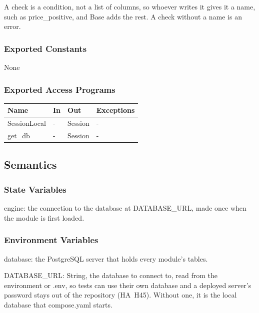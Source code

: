 \documentclass[12pt, titlepage]{article}
\begin{document}
\noindent A check is a condition, not a list of columns, so whoever writes it
gives it a name, such as price\_positive, and Base adds the rest. A check
without a name is an error.

\subsubsection{Exported Constants}

None

\subsubsection{Exported Access Programs}

\begin{center}
\begin{tabular}{p{3cm} p{2cm} p{3cm} p{3cm}}
\toprule
\textbf{Name} & \textbf{In} & \textbf{Out} & \textbf{Exceptions} \\
\midrule
SessionLocal & - & Session & - \\
get\_db & - & Session & - \\
\bottomrule
\end{tabular}
\end{center}

\subsection{Semantics}

\subsubsection{State Variables}

engine: the connection to the database at DATABASE\_URL, made once when the
module is first loaded.

\subsubsection{Environment Variables}

\noindent database: the PostgreSQL server that holds every module's tables.

\medskip

\noindent DATABASE\_URL: String, the database to connect to, read from the
environment or .env, so tests can use their own database and a deployed
server's password stays out of the repository (HA~H45). Without one, it is the
local database that compose.yaml starts.
\end{document}
